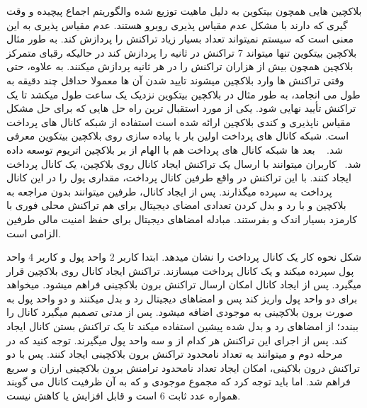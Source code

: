 


بلاکچین هایی همچون بیتکوین به دلیل ماهیت توزیع شده والگوریتم اجماع پیچیده و وقت گیری که دارند با مشکل عدم مقیاس پذیری روبرو هستند. عدم مقیاس پذیری به این معنی است که سیستم نمیتواند تعداد بسیار زیاد تراکنش را پردازش کند. به طور مثال بلاکچین بیتکوین تنها میتواند 7 تراکنش در ثانیه را پردازش کند در حالیکه رقبای متمرکز بلاکچین همچون  بیش از هزاران تراکنش را در هر ثانیه پردازش میکنند. به علاوه، حتی وقتی تراکنش ها وارد بلاکچین میشوند تایید شدن آن ها معمولا حداقل چند دقیقه به طول می انجامد، به طور مثال در بلاکچین بیتکوین نزدیک یک ساعت طول میکشد تا یک تراکنش تأیید نهایی شود. یکی از مورد استقبال ترین راه حل هایی که برای حل مشکل مقیاس ناپذیری و کندی بلاکچین ارائه شده است استفاده از شبکه کانال های پرداخت است.
شبکه کانال های پرداخت اولین بار با پیاده سازی  روی بلاکچین بیتکوین معرفی شد.
~\cite{poon2015lightning}
بعد ها شبکه کانال های پرداخت  هم با الهام از  بر بلاکچین اتریوم توسعه داده شد.~\cite{raiden}
کاربران میتوانند با ارسال یک تراکنش ایجاد کانال  روی بلاکچین، یک کانال پرداخت ایجاد کنند. با این تراکنش در واقع طرفین کانال پرداخت، مقداری پول را در این کانال پرداخت به سپرده میگذارند. پس از ایجاد کانال، طرفین میتوانند بدون مراجعه به بلاکچین و با رد و بدل کردن تعدادی امضای دیجیتال برای هم تراکنش محلی فوری با کارمزد بسیار اندک و بفرستند. مبادله امضاهای دیجیتال برای حفظ امنیت مالی طرفین الزامی است.

 شکل  نحوه کار یک کانال پرداخت را نشان میدهد. ابتدا کاربر  $2$ واحد پول و کاربر  $4$ واحد پول سپرده میکند و یک کانال پرداخت میسازند. تراکنش ایجاد کانال روی بلاکچین قرار میگیرد. پس از ایجاد کانال امکان ارسال تراکنش برون بلاکچینی فراهم میشود.  میخواهد برای  دو واحد پول واریز کند پس  و  امضاهای دیجیتال رد و بدل میکنند و دو واحد پول به صورت برون بلاکچینی به موجودی  اضافه میشود. پس از مدتی  تصمیم میگیرد کانال را ببندد؛ از امضاهای رد و بدل شده پیشین استفاده میکند تا یک تراکنش بستن کانال ایجاد کند. پس از اجرای این تراکنش هر کدام از  و  سه واحد پول میگیرند. توجه کنید که در مرحله دوم  و  میتوانند به تعداد نامحدود تراکنش برون بلاکچینی ایجاد کنند. پس با دو تراکنش درون بلاکینی، امکان ایجاد تعداد نامحدود ترامنش برون بلاکچینی ارزان و سریع فراهم شد. اما باید توجه کرد که مجموع موجودی  و  که به آن ظرفیت کانال  می گویند همواره عدد ثابت $6$ است و قابل افزایش یا کاهش نیست.  
 

